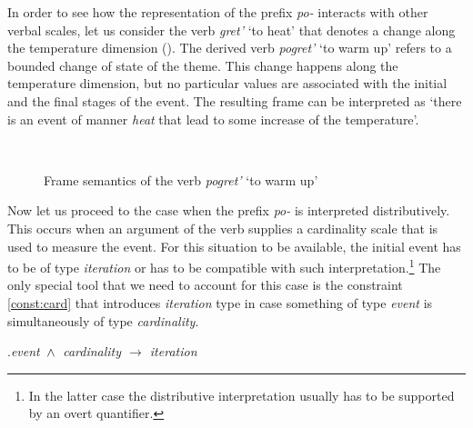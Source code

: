 In order to see how the representation of the prefix \textit{po-}   interacts with other verbal scales, let us consider the verb \textit{gret'} `to heat' that denotes a change along the temperature dimension (). The derived verb \textit{pogret'} `to warm up' refers to a bounded change of state of the theme. This change happens along the temperature dimension, but no particular values are associated with the initial and the final stages of the event. The resulting frame can be interpreted as `there is an event of manner \textit{heat} that lead to some increase of the temperature'.

\begin{figure}
\centering
{}\\
\caption{Frame semantics of the verb \textit{pogret'} `to warm up' \label{frame:pogret}}
\end{figure}

Now let us proceed to the case when the prefix \textit{po-}   is interpreted distributively. This occurs when an argument of the verb supplies a cardinality scale that is used to measure the event. For this situation to be available, the initial event has to be of type \textit{iteration} or has to be compatible with such interpretation.\footnote{In the latter case the distributive  interpretation usually has to be supported by an overt quantifier.} The only special tool that we need to account for this case is the constraint \ref{const:card} that introduces \textit{iteration} type in case something of type \textit{event} is simultaneously of type \textit{cardinality}. 

\ex.\label{const:card}\textit{event $\,\wedge\,$ cardinality $\rightarrow$ iteration}

